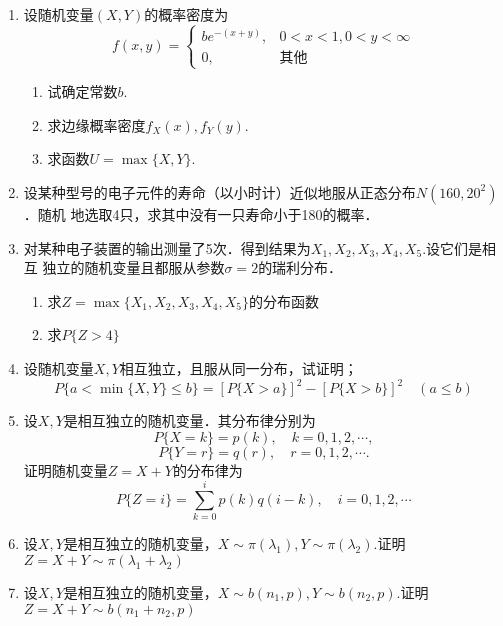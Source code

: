 \documentclass[10pt,a4paper]{article}
\begin{document}
\begin{enumerate}
    \item 设随机变量$(X,Y)$的概率密度为
    $$f(x,y)=\left\{\begin{array}{ll}
        be^{-(x+y)}, & 0<x<1,0<y<\infty\\
        0, & \mbox{其他}
    \end{array}\right.$$
    \begin{enumerate}
        \item 试确定常数$b$.
        \item 求边缘概率密度$f_X(x),f_Y(y)$.
        \item 求函数$U=\max\{X,Y\}$.
    \end{enumerate}
   


    \item 设某种型号的电子元件的寿命（以小时计）近似地服从正态分布$N(160,20^2)$．随机
    地选取4只，求其中没有一只寿命小于180的概率．



    \item 对某种电子装置的输出测量了5次．得到结果为$X_1,X_2,X_3,X_4,X_5$.设它们是相互
    独立的随机变量且都服从参数$\sigma=2$的瑞利分布．
    \begin{enumerate}
        \item 求$Z=\max \{X_1,X_2,X_3,X_4,X_5\}$的分布函数
        \item 求$P\{Z>4\}$
    \end{enumerate}


    \item 设随机变量$X,Y$相互独立，且服从同一分布，试证明；
    $$P\{a<\min \{X,Y\} \leq b\}={[P\{X>a\}]}^2-{[P\{X>b\}]}^2\quad (a\leq b)$$


    \item 设$X,Y$是相互独立的随机变量．其分布律分别为
    $$P\{X=k\}=p(k),\quad k=0,1,2,\cdots,$$
    $$P\{Y=r\}=q(r),\quad r=0,1,2,\cdots.$$
    证明随机变量$Z=X+Y$的分布律为
    $$P\{Z=i\}=\sum _{k=0}^i p(k)q(i-k),\quad i=0,1,2,\cdots$$


    \item 设$X,Y$是相互独立的随机变量，$X\sim \pi(\lambda_1),Y\sim \pi(\lambda_2)$.证明$Z=X+Y\sim \pi(\lambda_1+\lambda_2)$
    
    
    
    \item 设$X,Y$是相互独立的随机变量，$X\sim b(n_1,p),Y\sim b(n_2,p)$.证明$Z=X+Y\sim b(n_1+n_2,p)$
    


\end{enumerate}
\end{document}
